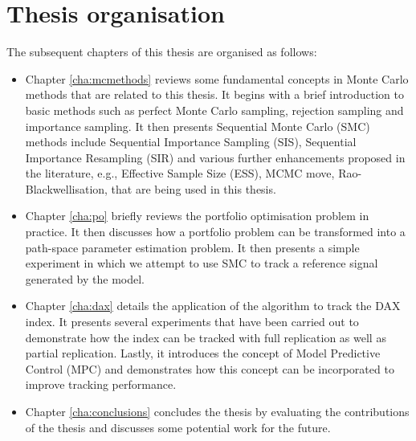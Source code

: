 \section{Thesis organisation}
The subsequent chapters of this thesis are organised as follows:
\begin{itemize}
\item Chapter \ref{cha:mcmethods} reviews some fundamental concepts in Monte Carlo methods that are related to this thesis. It begins with a brief introduction to basic methods such as perfect Monte Carlo sampling, rejection sampling and importance sampling. It then presents Sequential Monte Carlo (SMC) methods include Sequential Importance Sampling (SIS), Sequential Importance Resampling (SIR) and various further enhancements proposed in the literature, e.g., Effective Sample Size (ESS), MCMC move, Rao-Blackwellisation, that are being used in this thesis.
\item Chapter \ref{cha:po} briefly reviews the portfolio optimisation problem in practice. It then discusses how a portfolio problem can be transformed into a path-space parameter estimation problem. It then presents a simple experiment in which we attempt to use SMC to track a reference signal generated by the model.
\item Chapter \ref{cha:dax} details the application of the algorithm to track the DAX index. It presents several experiments that have been carried out to demonstrate how the index can be tracked with full replication as well as partial replication. Lastly, it introduces the concept of Model Predictive Control (MPC) and demonstrates how this concept can be incorporated to improve tracking performance.
\item Chapter \ref{cha:conclusions} concludes the thesis by evaluating the contributions of the thesis and discusses some potential work for the future.
\end{itemize}



